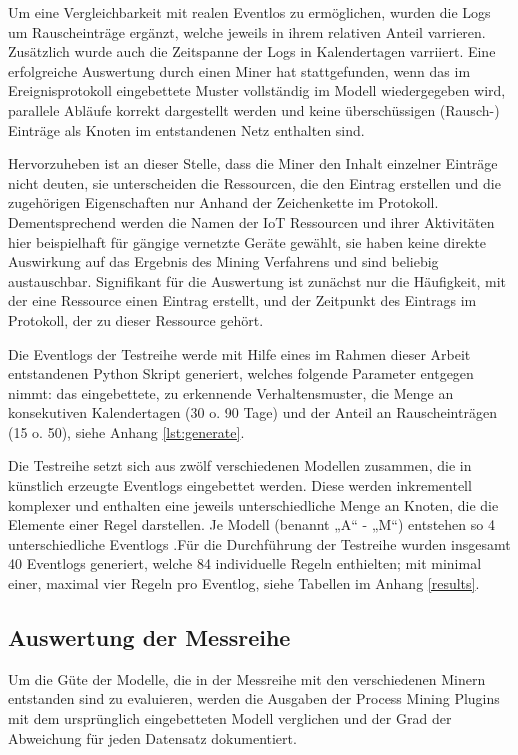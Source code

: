 Um eine Vergleichbarkeit mit realen Eventlos zu ermöglichen, wurden die Logs um Rauscheinträge ergänzt, welche jeweils in ihrem relativen Anteil varrieren. Zusätzlich wurde auch die Zeitspanne der Logs in Kalendertagen varriiert. Eine erfolgreiche Auswertung durch einen Miner hat stattgefunden, wenn das im Ereignisprotokoll eingebettete Muster vollständig im Modell wiedergegeben wird, parallele Abläufe korrekt dargestellt werden und keine überschüssigen (Rausch-) Einträge als Knoten im entstandenen Netz enthalten sind.

Hervorzuheben ist an dieser Stelle, dass die Miner den Inhalt einzelner Einträge nicht deuten, sie unterscheiden die Ressourcen, die den Eintrag erstellen und die zugehörigen Eigenschaften nur Anhand der Zeichenkette im Protokoll. Dementsprechend werden die Namen der IoT Ressourcen und ihrer Aktivitäten hier beispielhaft für gängige vernetzte Geräte gewählt, sie haben keine direkte Auswirkung auf das Ergebnis des Mining Verfahrens und sind beliebig austauschbar. Signifikant für die Auswertung ist zunächst nur die Häufigkeit, mit der eine Ressource einen Eintrag erstellt, und der Zeitpunkt des Eintrags im Protokoll, der zu dieser Ressource gehört.

Die Eventlogs der Testreihe werde mit Hilfe eines im Rahmen dieser Arbeit entstandenen Python Skript generiert, welches folgende Parameter entgegen nimmt: das eingebettete, zu erkennende Verhaltensmuster, die Menge an konsekutiven Kalendertagen (30 o. 90 Tage) und der Anteil an Rauscheinträgen (15 o. 50), siehe Anhang \ref{lst:generate}.

Die Testreihe setzt sich aus zwölf verschiedenen Modellen zusammen, die in künstlich erzeugte Eventlogs eingebettet werden. Diese werden inkrementell komplexer und enthalten eine jeweils unterschiedliche Menge an Knoten, die die Elemente einer Regel darstellen. Je Modell (benannt „A“ - „M“) entstehen so 4 unterschiedliche Eventlogs .Für die Durchführung der Testreihe wurden insgesamt 40 Eventlogs generiert, welche 84 individuelle Regeln enthielten; mit minimal einer, maximal vier Regeln pro Eventlog, siehe Tabellen im Anhang \ref{results}. 

\subsection{Auswertung der Messreihe}
Um die Güte der Modelle, die in der Messreihe mit den verschiedenen Minern entstanden sind zu evaluieren, werden die Ausgaben der Process Mining Plugins mit dem ursprünglich eingebetteten Modell verglichen und der Grad der Abweichung für jeden Datensatz dokumentiert.


